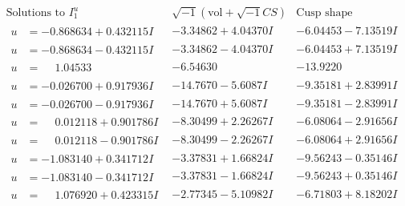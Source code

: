 \documentclass[1p]{elsarticle_modified}
\theoremstyle{definition}
\newcommand{\I}{\sqrt{-1}}
\begin{document}
$$\begin{array}{c|c|c}  
\text{Solutions to }I^u_{1}& \I (\text{vol} + \sqrt{-1}CS) & \text{Cusp shape}\\
 \hline 
\begin{aligned}
u &= -0.868634 + 0.432115 I\end{aligned}
 & -3.34862 + 4.04370 I & -6.04453 - 7.13519 I \\ \hline\begin{aligned}
u &= -0.868634 - 0.432115 I\end{aligned}
 & -3.34862 - 4.04370 I & -6.04453 + 7.13519 I \\ \hline\begin{aligned}
u &= \phantom{-}1.04533\phantom{ +0.000000I}\end{aligned}
 & -6.54630\phantom{ +0.000000I} & -13.9220\phantom{ +0.000000I} \\ \hline\begin{aligned}
u &= -0.026700 + 0.917936 I\end{aligned}
 & -14.7670 - 5.6087 I & -9.35181 + 2.83991 I \\ \hline\begin{aligned}
u &= -0.026700 - 0.917936 I\end{aligned}
 & -14.7670 + 5.6087 I & -9.35181 - 2.83991 I \\ \hline\begin{aligned}
u &= \phantom{-}0.012118 + 0.901786 I\end{aligned}
 & -8.30499 + 2.26267 I & -6.08064 - 2.91656 I \\ \hline\begin{aligned}
u &= \phantom{-}0.012118 - 0.901786 I\end{aligned}
 & -8.30499 - 2.26267 I & -6.08064 + 2.91656 I \\ \hline\begin{aligned}
u &= -1.083140 + 0.341712 I\end{aligned}
 & -3.37831 + 1.66824 I & -9.56243 - 0.35146 I \\ \hline\begin{aligned}
u &= -1.083140 - 0.341712 I\end{aligned}
 & -3.37831 - 1.66824 I & -9.56243 + 0.35146 I \\ \hline\begin{aligned}
u &= \phantom{-}1.076920 + 0.423315 I\end{aligned}
 & -2.77345 - 5.10982 I & -6.71803 + 8.18202 I \\ \hline\begin{aligned}

\end{aligned}
\end{array}$$
\end{document}
